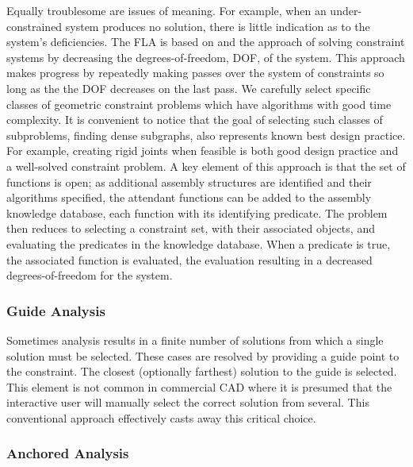\documentclass[]{report}
\begin{document}
Equally troublesome are issues of meaning. 
For example, when an under-constrained system produces no solution, 
there is little indication as to the system's deficiencies.
The FLA is based on \citep{kramer1991sgcs} and the approach of solving constraint 
systems by decreasing the degrees-of-freedom, DOF, of the system.  
This approach makes progress by repeatedly making passes over the 
system of constraints so long as the the DOF decreases on the last pass. 
We carefully select specific classes of geometric constraint problems 
which have algorithms with good time complexity. 
It is convenient to notice that the  goal of selecting such 
classes of subproblems, finding dense subgraphs, also represents known best design practice. 
For example, creating rigid joints when feasible is both good design practice 
and a well-solved constraint problem. A key element of this approach 
is that the set of functions is open; 
as additional assembly structures are identified and their 
algorithms specified, the attendant functions can be added 
to the assembly knowledge database, each function with its identifying predicate. 
The problem then reduces to selecting a constraint set, 
with their associated objects, and evaluating the predicates in the knowledge database. 
When a predicate is true, the associated function is evaluated, 
the evaluation resulting in a decreased degrees-of-freedom for the system.  

\subsubsection{Guide Analysis}

Sometimes analysis results in a finite number of solutions 
from which a single solution must be selected. 
These cases are resolved by providing a guide point to the constraint. 
The closest (optionally farthest) solution to the guide is selected. 
This element is not common in commercial CAD where it is presumed that the interactive user will manually select the correct solution from several. 
This conventional approach effectively casts away this critical choice.

\subsubsection{Anchored Analysis}
\end{document}

